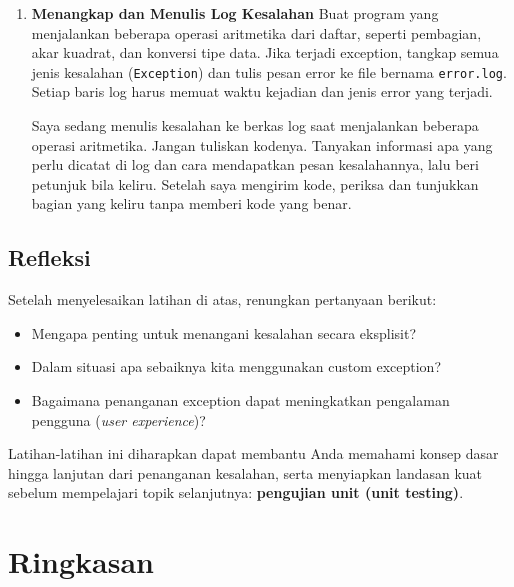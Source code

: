 \begin{enumerate}
      \begin{promptterarah}
      Saya sedang membuat simulasi ATM yang menolak transaksi tidak valid dengan exception. Jangan tuliskan kodenya. Tanyakan kondisi apa saja yang membuat transaksi ditolak, lalu periksa daftar saya. Setelah saya mengirim kode, beri beberapa skenario transaksi untuk saya uji sendiri.
      \end{promptterarah}
    \item \textbf{Menangkap dan Menulis Log Kesalahan}  
    Buat program yang menjalankan beberapa operasi aritmetika dari daftar, seperti pembagian, akar kuadrat, dan konversi tipe data.  
    Jika terjadi exception, tangkap semua jenis kesalahan (\texttt{Exception}) dan tulis pesan error ke file bernama \texttt{error.log}.  
    Setiap baris log harus memuat waktu kejadian dan jenis error yang terjadi.
  \begin{promptterarah}
  Saya sedang menulis kesalahan ke berkas log saat menjalankan beberapa operasi aritmetika. Jangan tuliskan kodenya. Tanyakan informasi apa yang perlu dicatat di log dan cara mendapatkan pesan kesalahannya, lalu beri petunjuk bila keliru. Setelah saya mengirim kode, periksa dan tunjukkan bagian yang keliru tanpa memberi kode yang benar.
  \end{promptterarah}
\end{enumerate}

\subsection*{Refleksi}

Setelah menyelesaikan latihan di atas, renungkan pertanyaan berikut:
\begin{itemize}
    \item Mengapa penting untuk menangani kesalahan secara eksplisit?
    \item Dalam situasi apa sebaiknya kita menggunakan custom exception?
    \item Bagaimana penanganan exception dapat meningkatkan pengalaman pengguna (\textit{user experience})?
\end{itemize}

Latihan-latihan ini diharapkan dapat membantu Anda memahami konsep dasar hingga lanjutan dari penanganan kesalahan, serta menyiapkan landasan kuat sebelum mempelajari topik selanjutnya: \textbf{pengujian unit (unit testing)}.


\section{Ringkasan}

